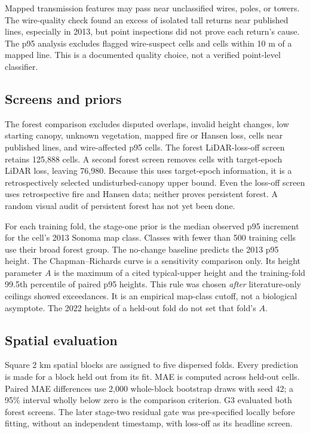 \documentclass[11pt]{article}
\begin{document}
Mapped transmission features may pass near unclassified wires, poles,
or towers. The wire-quality check found an excess of isolated tall
returns near published lines, especially in 2013, but point inspections
did not prove each return's cause. The p95 analysis excludes flagged
wire-suspect cells and cells within 10 m of a mapped line. This is a
documented quality choice, not a verified point-level classifier.

\subsection{Screens and priors}
The forest comparison excludes disputed overlaps, invalid height changes,
low starting canopy, unknown vegetation, mapped fire or Hansen loss, cells
near published lines, and wire-affected p95 cells. The forest
LiDAR-loss-off screen retains 125,888 cells. A second forest screen
removes cells with target-epoch LiDAR loss, leaving 76,980. Because this
uses target-epoch information, it is a retrospectively selected
undisturbed-canopy upper bound. Even the loss-off screen uses retrospective
fire and Hansen data; neither proves persistent forest. A random visual
audit of persistent forest has not yet been done.

For each training fold, the stage-one prior is the median observed p95
increment for the cell's 2013 Sonoma map class. Classes with fewer than
500 training cells use their broad forest group. The no-change baseline
predicts the 2013 p95 height. The Chapman--Richards curve is a sensitivity
comparison only. Its height parameter $A$ is the maximum of a cited
typical-upper height and the training-fold 99.5th percentile of paired
p95 heights. This rule was chosen \emph{after} literature-only ceilings
showed exceedances. It is an empirical map-class cutoff, not a biological
asymptote. The 2022 heights of a held-out fold do not set that fold's $A$.

\subsection{Spatial evaluation}
Square 2 km spatial blocks are assigned to five dispersed folds. Every
prediction is made for a block held out from its fit. MAE is computed
across held-out cells. Paired MAE differences use 2,000 whole-block
bootstrap draws with seed 42; a 95\% interval wholly below zero is the
comparison criterion. G3 evaluated both forest screens. The later
stage-two residual gate was pre-specified locally before fitting, without
an independent timestamp, with loss-off as its headline screen.
\end{document}
